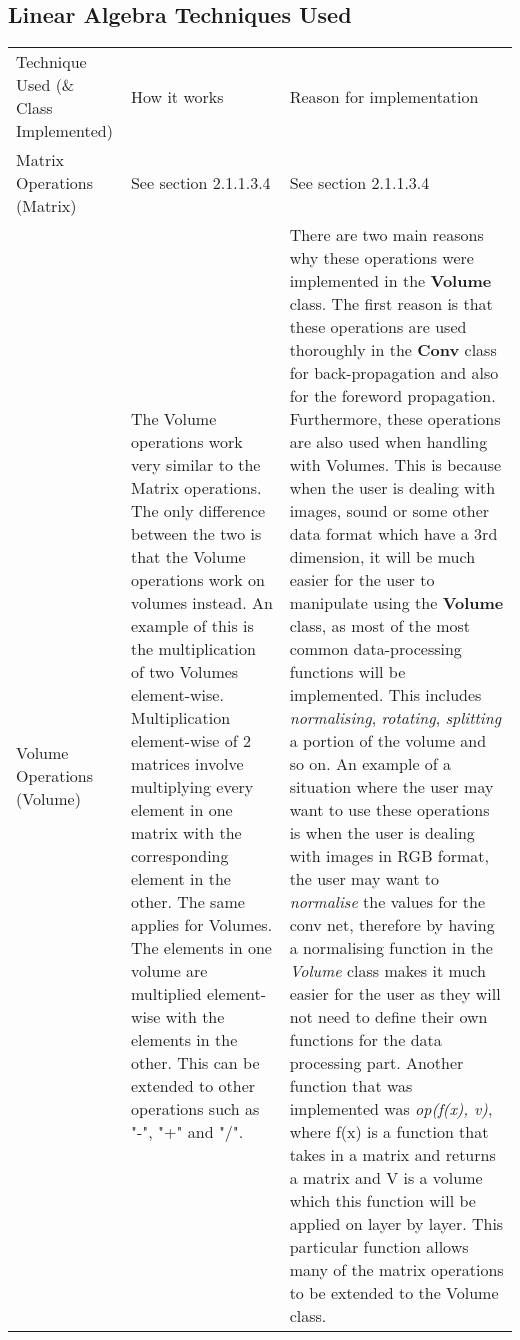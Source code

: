 \subsection{Linear Algebra Techniques Used}
\begin{table}[H]
\centering
    \begin{tabular}{|p{2.2cm}|p{6cm}|p{7cm}|}
    \hline
    Technique Used (\& Class Implemented) & How it works & Reason for implementation \\ \cline{1-3}
    
    Matrix Operations (Matrix) & See section 2.1.1.3.4  & See section 2.1.1.3.4 \\ \cline{1-3}
    
    Volume Operations (Volume) & The Volume operations work very similar to the Matrix operations. The only difference between the two is that the Volume operations work on volumes instead. An example of this is the multiplication of two Volumes element-wise. Multiplication element-wise of 2 matrices involve multiplying every element in one matrix with the corresponding element in the other. The same applies for Volumes. The elements in one volume are multiplied element-wise with the elements in the other. This can be extended to other operations such as "-", "+" and "/". & There are two main reasons why these operations were implemented in the \textbf{Volume} class. The first reason is that these operations are used thoroughly in the \textbf{Conv} class for back-propagation and also for the foreword propagation. Furthermore, these operations are also used when handling with Volumes. This is because when the user is dealing with images, sound or some other data format which have a 3rd dimension, it will be much easier for the user to manipulate using the \textbf{Volume} class, as most of the most common data-processing functions will be implemented. This includes \textit{normalising}, \textit{rotating}, \textit{splitting} a portion of the volume and so on. An example of a situation where the user may want to use these operations is when the user is dealing with images in RGB format, the user may want to \textit{normalise} the values for the conv net, therefore by having a normalising function in the \textit{Volume} class makes it much easier for the user as they will not need to define their own functions for the data processing part. Another function that was implemented was \textit{op(f(x), v)}, where f(x) is a function that takes in a matrix and returns a matrix and V is a volume which this function will be applied on layer by layer. This particular function allows many of the matrix operations to be extended to the Volume class.  \\ \cline{1-3}
    

\end{tabular}
\end{table}
